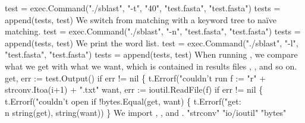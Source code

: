 test = exec.Command("./sblast", "-t", "40",
          "test.fasta", "test.fasta")
tests = append(tests, test)
\nwendcode{}\nwdocspar
We switch from matching with a keyword tree to na\"ive matching.
\nwenddocs{}\endmoddef\nwstartdeflinemarkup{}\nwenddeflinemarkup
test = exec.Command("./sblast", "-n",
          "test.fasta", "test.fasta")
tests = append(tests, test)
\nwendcode{}\nwdocspar
We print the word list.
\nwenddocs{}\endmoddef\nwstartdeflinemarkup{}\nwenddeflinemarkup
test = exec.Command("./sblast", "-l",
          "test.fasta", "test.fasta")
tests = append(tests, test)
\nwendcode{}\nwdocspar
When running , we compare what we get with what we want,
which is contained in results files , , and so
on.
\nwenddocs{}\endmoddef\nwstartdeflinemarkup{}\nwenddeflinemarkup
get, err := test.Output()
if err != nil \{ t.Errorf("couldn't run %
f := "r" + strconv.Itoa(i+1) + ".txt"
want, err := ioutil.ReadFile(f)
if err != nil \{ t.Errorf("couldn't open %
if !bytes.Equal(get, want) \{
          t.Errorf("get:\\n%
                  string(get), string(want))
\}
\nwendcode{}\nwdocspar
We import , , and .
\nwenddocs{}\plusendmoddef\nwstartdeflinemarkup{}\nwenddeflinemarkup
"strconv"
"io/ioutil"
"bytes"
\nwendcode{}

